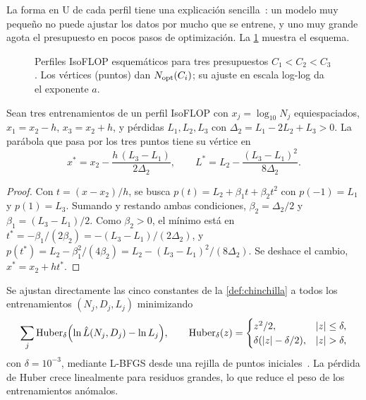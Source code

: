 La forma en U de cada perfil tiene una explicación sencilla~\cite[§2.1]{cs336a3}: un modelo muy pequeño no puede ajustar los datos por mucho que se entrene, y uno muy grande agota el presupuesto en pocos pasos de optimización. La \cref{fig:isoflop} muestra el esquema.

\begin{figure}[h]
\centering
{}
\caption{Perfiles IsoFLOP esquemáticos para tres presupuestos $C_1<C_2<C_3$. Los vértices (puntos) dan $N_{\mathrm{opt}}(C_i)$; su ajuste en escala log-log da el exponente $a$.}
\label{fig:isoflop}
\end{figure}

\begin{proposicion}\label{prop:vertice}
Sean tres entrenamientos de un perfil IsoFLOP con $x_j=\log_{10}N_j$ equiespaciados, $x_1=x_2-h$, $x_3=x_2+h$, y pérdidas $L_1,L_2,L_3$ con $\Delta_2=L_1-2L_2+L_3>0$. La parábola que pasa por los tres puntos tiene su vértice en
\[
x^{*}=x_2-\frac{h\,(L_3-L_1)}{2\Delta_2},\qquad L^{*}=L_2-\frac{(L_3-L_1)^{2}}{8\Delta_2}.
\]
\end{proposicion}

\begin{proof}
Con $t=(x-x_2)/h$, se busca $p(t)=L_2+\beta_1t+\beta_2t^{2}$ con $p(-1)=L_1$ y $p(1)=L_3$. Sumando y restando ambas condiciones, $\beta_2=\Delta_2/2$ y $\beta_1=(L_3-L_1)/2$. Como $\beta_2>0$, el mínimo está en $t^{*}=-\beta_1/(2\beta_2)=-(L_3-L_1)/(2\Delta_2)$, y $p(t^{*})=L_2-\beta_1^{2}/(4\beta_2)=L_2-(L_3-L_1)^{2}/(8\Delta_2)$. Se deshace el cambio, $x^{*}=x_2+ht^{*}$.
\end{proof}

\begin{definicion}
Se ajustan directamente las cinco constantes de la \cref{def:chinchilla} a todos los entrenamientos $(N_j,D_j,L_j)$ minimizando
\[
\sum_j\mathrm{Huber}_\delta\Bigl(\ln\hat L(N_j,D_j)-\ln L_j\Bigr),\qquad
\mathrm{Huber}_\delta(z)=\begin{cases}z^{2}/2,&\lvert z\rvert\le\delta,\\ \delta(\lvert z\rvert-\delta/2),&\lvert z\rvert>\delta,\end{cases}
\]
con $\delta=10^{-3}$, mediante L-BFGS desde una rejilla de puntos iniciales~\cite[§3.3]{hoffmann}. La pérdida de Huber crece linealmente para residuos grandes, lo que reduce el peso de los entrenamientos anómalos.
\end{definicion}

